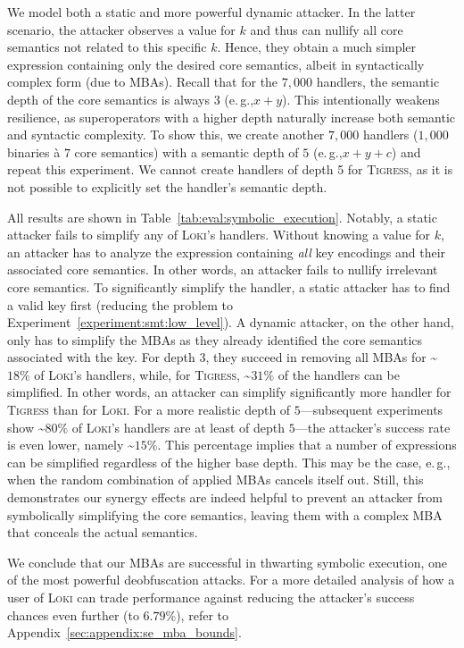 \documentclass[letterpaper,twocolumn,10pt]{article}
\newcommand{\eg}{e.\,g.,\xspace}
\newcommand{\ex}[1]{Experiment~\ref{#1}}
\theoremstyle{customexample}
\theoremstyle{customexperiment}
\newcommand{\loki}{\textsc{Loki}\xspace}
\newcommand{\tigress}{\textsc{Tigress}\xspace}
\begin{document}
We model both a static and more powerful dynamic attacker. In the latter scenario, the attacker observes a value for $k$ and thus can nullify all core semantics not related to this specific $k$. Hence, they obtain a much simpler expression containing only the desired core semantics, albeit in syntactically complex form (due to MBAs).
Recall that for the $7,000$ handlers, the semantic depth of the core semantics is always $3$ (\eg $x + y$). This intentionally weakens resilience, as superoperators with a higher depth naturally increase both semantic and syntactic complexity. To show this, we create another $7,000$ handlers ($1,000$ binaries à $7$ core semantics) with a semantic depth of $5$ (\eg $x + y + c$) and repeat this experiment. We cannot create handlers of depth 5 for \tigress, as it is not possible to explicitly set the handler's semantic depth.

All results are shown in Table~\ref{tab:eval:symbolic_execution}. Notably, a static attacker fails to simplify any of \loki's handlers. Without knowing a value for $k$, an attacker has to analyze the expression containing \emph{all} key encodings and their associated core semantics. In other words, an attacker fails to nullify irrelevant core semantics. To significantly simplify the handler, a static attacker has to find a valid key first (reducing the problem to \ex{experiment:smt:low_level}).
A dynamic attacker, on the other hand, only has to simplify the MBAs as they already identified the core semantics associated with the key. For depth $3$, they succeed in removing all MBAs for \textasciitilde$18\%$ of \loki's handlers, while, for \tigress, \textasciitilde$31\%$ of the handlers can be simplified. In other words, an attacker can simplify significantly more handler for \tigress than for \loki.
For a more realistic depth of $5$---subsequent experiments show \textasciitilde$80\%$ of \loki's handlers are at least of depth $5$---the attacker's success rate is even lower, namely \textasciitilde$15\%$. 
This percentage implies that a number of expressions can be simplified regardless of the higher base depth. This may be the case, \eg when the random combination of applied MBAs cancels itself out.
Still, this demonstrates our synergy effects are indeed helpful to prevent an attacker from symbolically simplifying the core semantics, leaving them with a complex MBA that conceals the actual semantics. 

We conclude that our MBAs are successful in thwarting symbolic execution, one of the most powerful deobfuscation attacks. For a more detailed analysis of how a user of \loki can trade performance against reducing the attacker's success chances even further (to $6.79\%$), refer to Appendix~\ref{sec:appendix:se_mba_bounds}.
\end{document}
